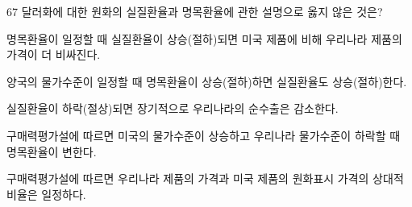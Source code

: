\begin{question}{67}
달러화에 대한 원화의 실질환율과 명목환율에 관한 설명으로 옳지 않은 것은?
\begin{choices}
  \item 명목환율이 일정할 때 실질환율이 상승(절하)되면 미국 제품에 비해 우리나라 제품의 가격이 더 비싸진다.
  \item 양국의 물가수준이 일정할 때 명목환율이 상승(절하)하면 실질환율도 상승(절하)한다.
  \item 실질환율이 하락(절상)되면 장기적으로 우리나라의 순수출은 감소한다.
  \item 구매력평가설에 따르면 미국의 물가수준이 상승하고 우리나라 물가수준이 하락할 때 명목환율이 변한다.
  \item 구매력평가설에 따르면 우리나라 제품의 가격과 미국 제품의 원화표시 가격의 상대적 비율은 일정하다.
\end{choices}
\end{question}
